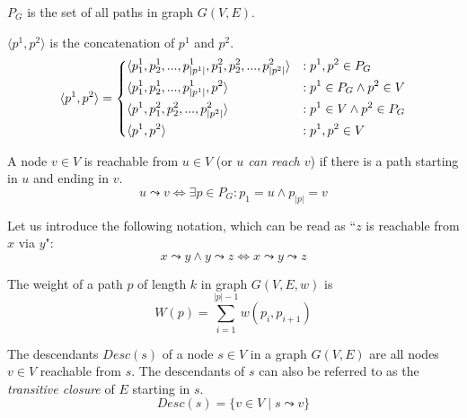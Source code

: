 \begin{definition}
    $P_G$ is the set of all paths in graph $G(V,E)$.
\end{definition}
\begin{definition}
    $\langle p^1, p^2 \rangle$ is the concatenation of $p^1$ and $p^2$.
    \begin{equation*}
        \langle p^1, p^2 \rangle = \begin{dcases}
            \langle p^1_1, p^1_2,...,p^1_{|p^1|}, p^2_1,p^2_2,...,p^2_{|p^2|} \rangle & : p^1,p^2 \in P_G \\
            \langle p^1_1, p^1_2,...,p^1_{|p^1|}, p^2                         \rangle & : p^1 \in P_G \wedge p^2 \in V \\
            \langle p^1, p^2_1, p^2_2,..., p^2_{|p^2|}                        \rangle & : p^1 \in V \wedge p^2 \in P_G \\
            \langle p^1, p^2                                                  \rangle & : p^1,p^2 \in V \\
        \end{dcases}
    \end{equation*}
\end{definition}
\begin{definition}[Reachability]
    A node $v \in V$ is reachable from $u \in V$ (or \emph{$u$ can reach $v$}) if there is a path starting in $u$ and ending in $v$.
    \begin{equation*}
        u \leadsto v \iff \exists p \in P_G \colon p_1 = u \wedge p_{|p|} = v
    \end{equation*}
\end{definition}
Let us introduce the following notation, which can be read as ``$z$ is reachable from $x$ via $y$":
\begin{equation*}
    x \leadsto y \wedge y \leadsto z \iff x \leadsto y \leadsto z
\end{equation*}
\begin{definition}
    The weight of a path $p$ of length $k$ in graph $G(V,E,w)$ is
    \begin{equation*}
        W(p) = \sum_{i=1}^{|p|-1}{w(p_i, p_{i+1})}
    \end{equation*}
\end{definition}
\begin{definition}[Descendants] \label{def:desc} The descendants $Desc(s)$ of a node $s \in V$ in a graph $G(V,E)$ are all nodes $v \in V$ reachable from $s$. The descendants of $s$ can also be referred to as the \emph{transitive closure} of $E$ starting in $s$.
    \begin{equation*}
        Desc(s) = \{v \in V \mid s \leadsto v\}
    \end{equation*}
\end{definition}
